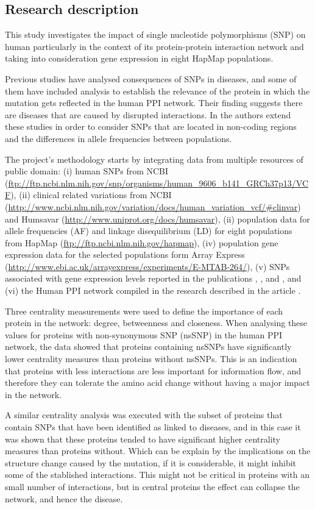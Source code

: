 \subsection{Research description}
This study investigates the impact of single nucleotide polymorphisms (SNP) on human particularly in the context of its protein-protein interaction network and taking into consideration gene expression in eight HapMap populations.

Previous studies have analysed consequences of SNPs in diseases, and some of them have included analysis to establish the relevance of the protein in which the mutation gets reflected in the human PPI network. Their finding suggests there are diseases that are caused by disrupted interactions. In \cite{HEE2014} the authors extend these studies in order to consider SNPs that are located in non-coding regions and the differences in allele frequencies between populations.

The project's methodology starts by integrating data from multiple resources of public domain: (i) human SNPs from NCBI (\url{ftp://ftp.ncbi.nlm.nih.gov/snp/organisms/human_9606_b141_GRCh37p13/VCF}), (ii) clinical related variations from NCBI (\url{http://www.ncbi.nlm.nih.gov/variation/docs/human_variation_vcf/#clinvar}) and Humsavar (\url{http://www.uniprot.org/docs/humsavar}), (ii) population data for allele frequencies (AF) and linkage disequilibrium (LD) for eight populations from HapMap (\url{ftp://ftp.ncbi.nlm.nih.gov/hapmap}), (iv) population gene expression data for the selected populations form Array Express (\url{http://www.ebi.ac.uk/arrayexpress/experiments/E-MTAB-264/}), (v) SNPs associated with gene expression levels reported in the publications \cite{STR2007}, \cite{LAP2013}, \cite{HAU2014} and \cite{WU2013}, and (vi) the Human PPI network compiled in the research described in the article \cite{RAP2013}.

Three centrality measurements were used to define the importance of each protein in the network: degree, betweenness and closeness. When analysing these values for proteins with non-synonymous SNP (nsSNP) in the human PPI network, the data showed that proteins containing nsSNPs have significantly lower centrality measures than proteins without nsSNPs. This is an indication that proteins with less interactions are less important for information flow, and therefore they can tolerate the amino acid change without having a major impact in the network.

A similar centrality analysis was executed with the subset of proteins that contain SNPs that have been identified as linked to diseases, and in this case it was shown that these proteins tended to have significant higher centrality measures than proteins without. Which can be explain by the implications on the structure change caused by the mutation, if it is considerable, it might inhibit some of the stablished interactions. This might not be critical in proteins with an small number of interactions, but in central proteins the effect can collapse the network, and hence the disease.

